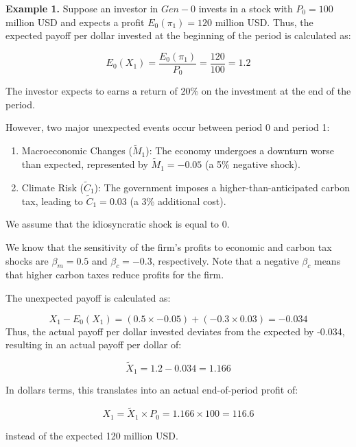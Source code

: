 \begin{example}[]
\textbf{Example 1.} 
Suppose an investor in $Gen-0$ invests in a stock
with $P_0 = 100$ million USD and
expects a profit $E_0(\pi_1) = 120$ million USD.
Thus, the expected payoff 
per dollar invested at the 
beginning of the period is calculated as:

\begin{equation}
    E_0(X_1) = \frac{E_0(\pi_1)}{P_0} = \frac{120}{100} = 1.2
\end{equation}

The investor expects to earns a return of 20\% on the investment
at the end of the period.

However, two major unexpected events occur 
between period 0 and period 1:

\begin{enumerate}
    \item Macroeconomic Changes (\(\tilde{M}_1\)): The economy undergoes a downturn worse than expected, represented by \(\tilde{M}_1 = -0.05\) (a 5\% negative shock).
    \item Climate Risk (\(\tilde{C}_1\)): The government imposes a higher-than-anticipated carbon tax, leading to \(\tilde{C}_1 = 0.03\) (a 3\% additional cost).
\end{enumerate}

We assume that the idiosyncratic shock is equal to 0.

We know that the sensitivity of the firm's 
profits to economic and carbon tax shocks 
are $\beta_m = 0.5$ and $\beta_{c} = - 0.3$, 
respectively. Note that a negative $\beta_{c}$
means that higher carbon taxes reduce profits
for the firm.

The unexpected payoff is calculated as:

\[
X_1 - E_0(X_1) = (0.5 \times -0.05) + (- 0.3 \times 0.03) = -0.034
\]
Thus, the actual payoff per dollar 
invested deviates from the expected 
by -0.034, resulting 
in an actual payoff per dollar of:

\begin{equation}
    \tilde{X}_1 = 1.2-0.034 = 1.166
\end{equation}

In dollars terms, this translates 
into an actual end-of-period profit of:

\begin{equation}
    X_1 = \tilde{X}_1 \times P_0 = 1.166 \times 100 = 116.6
\end{equation}

instead of the expected 120 million USD.

\end{example}


